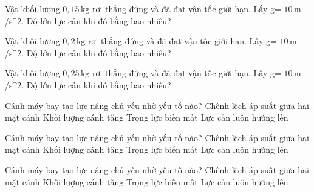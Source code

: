 \begin{bt}
Vật khối lượng $0,15\,\text{kg}$ rơi thẳng đứng và đã đạt vận tốc giới hạn. Lấy g= $10\,\text{m}$ /s^2. Độ lớn lực cản khi đó bằng bao nhiêu?
\end{bt}

\begin{bt}
Vật khối lượng $0,2\,\text{kg}$ rơi thẳng đứng và đã đạt vận tốc giới hạn. Lấy g= $10\,\text{m}$ /s^2. Độ lớn lực cản khi đó bằng bao nhiêu?
\end{bt}

\begin{bt}
Vật khối lượng $0,25\,\text{kg}$ rơi thẳng đứng và đã đạt vận tốc giới hạn. Lấy g= $10\,\text{m}$ /s^2. Độ lớn lực cản khi đó bằng bao nhiêu?
\end{bt}

\begin{ex}
Cánh máy bay tạo lực nâng chủ yếu nhờ yếu tố nào?
\choice
{\True Chênh lệch áp suất giữa hai mặt cánh}
{Khối lượng cánh tăng}
{Trọng lực biến mất}
{Lực cản luôn hướng lên}
\end{ex}

\begin{ex}
Cánh máy bay tạo lực nâng chủ yếu nhờ yếu tố nào?
\choice
{\True Chênh lệch áp suất giữa hai mặt cánh}
{Khối lượng cánh tăng}
{Trọng lực biến mất}
{Lực cản luôn hướng lên}
\end{ex}

\begin{ex}
Cánh máy bay tạo lực nâng chủ yếu nhờ yếu tố nào?
\choice
{\True Chênh lệch áp suất giữa hai mặt cánh}
{Khối lượng cánh tăng}
{Trọng lực biến mất}
{Lực cản luôn hướng lên}
\end{ex}

